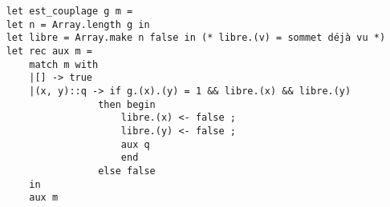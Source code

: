 \documentclass[varwidth = 35cm]{standalone}
\begin{document}
\begin{verbatim}
    let est_couplage g m =
    let n = Array.length g in
    let libre = Array.make n false in (* libre.(v) = sommet déjà vu *)
    let rec aux m =
        match m with
        |[] -> true
        |(x, y)::q -> if g.(x).(y) = 1 && libre.(x) && libre.(y)
                    then begin
                        libre.(x) <- false ;
                        libre.(y) <- false ;
                        aux q
                        end
                    else false
        in
        aux m
\end{verbatim}
\end{document}
